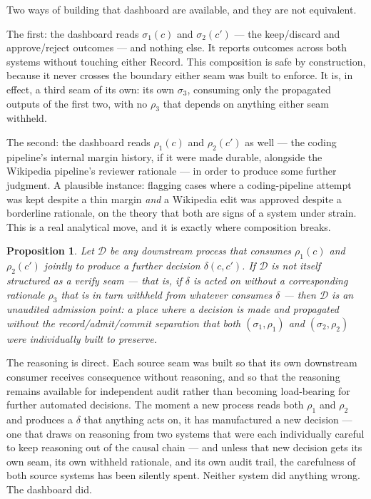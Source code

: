 \documentclass[11pt,openany]{book}
\newtheorem{proposition}{Proposition}[chapter]
\begin{document}
Two ways of building that dashboard are available, and they are not equivalent.

The first: the dashboard reads $\sigma_1(c)$ and $\sigma_2(c')$ — the keep/discard and approve/reject outcomes — and nothing else. It reports outcomes across both systems without touching either $\mathrm{Record}$. This composition is safe by construction, because it never crosses the boundary either seam was built to enforce. It is, in effect, a third seam of its own: its own $\sigma_3$, consuming only the propagated outputs of the first two, with no $\rho_3$ that depends on anything either seam withheld.

The second: the dashboard reads $\rho_1(c)$ and $\rho_2(c')$ as well — the coding pipeline's internal margin history, if it were made durable, alongside the Wikipedia pipeline's reviewer rationale — in order to produce some further judgment. A plausible instance: flagging cases where a coding-pipeline attempt was kept despite a thin margin \emph{and} a Wikipedia edit was approved despite a borderline rationale, on the theory that both are signs of a system under strain. This is a real analytical move, and it is exactly where composition breaks.

\begin{proposition}
Let $\mathcal{D}$ be any downstream process that consumes $\rho_1(c)$ and $\rho_2(c')$ jointly to produce a further decision $\delta(c,c')$. If $\mathcal{D}$ is not itself structured as a verify seam — that is, if $\delta$ is acted on without a corresponding rationale $\rho_3$ that is in turn withheld from whatever consumes $\delta$ — then $\mathcal{D}$ is an unaudited admission point: a place where a decision is made and propagated without the record/admit/commit separation that both $(\sigma_1,\rho_1)$ and $(\sigma_2,\rho_2)$ were individually built to preserve.
\end{proposition}

The reasoning is direct. Each source seam was built so that its own downstream consumer receives consequence without reasoning, and so that the reasoning remains available for independent audit rather than becoming load-bearing for further automated decisions. The moment a new process reads both $\rho_1$ and $\rho_2$ and produces a $\delta$ that anything acts on, it has manufactured a new decision — one that draws on reasoning from two systems that were each individually careful to keep reasoning out of the causal chain — and unless that new decision gets its own seam, its own withheld rationale, and its own audit trail, the carefulness of both source systems has been silently spent. Neither system did anything wrong. The dashboard did.
\end{document}
